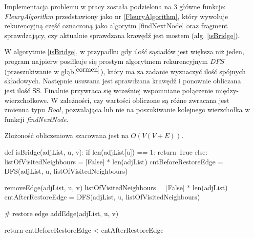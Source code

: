 \documentclass[a4paper, 12pt, twoside, openright]{article}
\begin{document}
	Implementacja problemu w pracy została podzielona na 3 główne funkcje: \textit{FleuryAlgorithm} przedstawiony jako nr \ref{FleuryAlgorithm}, który wywołuje rekurencyjną część oznaczoną jako algorytm \ref{findNextNode} oraz fragment sprawdzający, czy aktualnie sprawdzana krawędź jest mostem (alg. \ref{isBridge}).
 
	W algorytmie \ref{isBridge}, w przypadku gdy ilość sąsiadów jest większa niż jeden, program najpierw posiłkuje się prostym algorytmem rekurencyjnym $DFS$ (przeszukiwanie w głąb$^{\cite{cormen}}$), który ma za zadanie wyznaczyć ilość spójnych składowych. Następnie usuwana jest sprawdzana krawędź i ponownie obliczana jest ilość SS. Finalnie przywraca się wcześniej wspomniane połączenie między-wierzchołkowe. W zależności, czy wartości obliczone są różne zwracana jest zmienna typu $Bool$, pozwalająca lub nie na poszukiwanie kolejnego wierzchołka w funkcji \textit{findNextNode}.
	
	Złożoność obliczeniowa szacowana jest na $O(V(V+E))$.

\begin{algorithm}[caption={\textit{isBridge} rekurencyjna funkcja pomocnicza dla \textit{FleuryAlgorithm} }, label={isBridge}]
def isBridge(adjList, u, v):
	if len(adjList[u]) == 1:
		return True
	else:
		listOfVisitedNeighbours = [False] * len(adjList)
		cntBeforeRestoreEdge = DFS(adjList, u, listOfVisitedNeighbours)
		
		removeEdge(adjList, u, v)
		listOfVisitedNeighbours = [False] * len(adjList)
		cntAfterRestoreEdge = DFS(adjList, u, listOfVisitedNeighbours)
		
		# restore edge
		addEdge(adjList, u, v)
		
		return cntBeforeRestoreEdge < cntAfterRestoreEdge

\end{algorithm}
	\newpage
\end{document}
